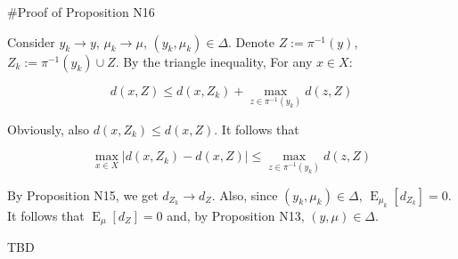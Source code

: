 \documentclass[a4paper]{article}
\DeclareMathOperator{\E}{E}
\newcommand{\Abs}[1]{\lvert #1 \rvert}
\begin{document}
\#Proof of Proposition N16

Consider ${y_k \rightarrow y}$, ${\mu_k \rightarrow \mu}$, ${(y_k, \mu_k) \in \Delta}$. Denote ${Z:=\pi^{-1}(y)}$, ${Z_k:=\pi^{-1}(y_k) \cup Z}$. By the triangle inequality, For any ${x \in X}$:

$$d(x, Z) \leq d(x, Z_k)  + \max_{z \in \pi^{-1}(y_k)} d(z,Z)$$

Obviously, also $d(x, Z_k) \leq d(x, Z)$. It follows that

$$\max_{x \in X} \Abs{d(x, Z_k) - d(x, Z)} \leq \max_{z \in \pi^{-1}(y_k)} d(z,Z)$$

By Proposition N15, we get ${d_{Z_k} \rightarrow d_Z}$. Also, since ${(y_k,\mu_k) \in \Delta}$, ${\E_{\mu_k}[d_{Z_k}] = 0}$. It follows that ${\E_\mu[d_Z] = 0}$ and, by Proposition N13, ${(y,\mu) \in \Delta}$.

TBD
\end{document}
